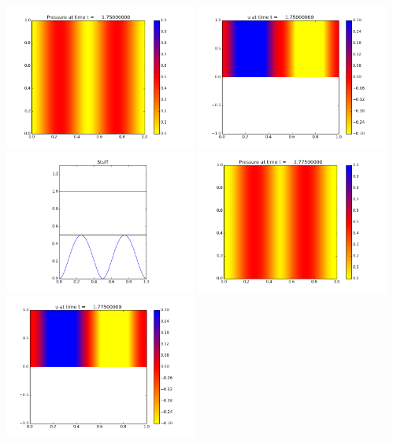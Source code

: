 \documentclass[11pt]{article}
\begin{document}
\vskip 10pt 
\includegraphics[width=0.475\textwidth]{frame0070fig0.png}
\includegraphics[width=0.475\textwidth]{frame0070fig1.png}
\vskip 10pt 
\includegraphics[width=0.475\textwidth]{frame0070fig3.png}
\vskip 10pt 
\includegraphics[width=0.475\textwidth]{frame0071fig0.png}
\includegraphics[width=0.475\textwidth]{frame0071fig1.png}
\end{document}

